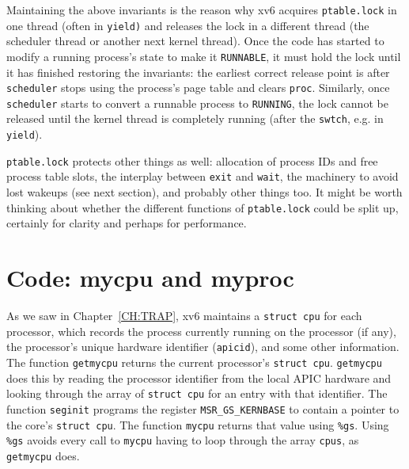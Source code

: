 Maintaining the above invariants is the reason why xv6 acquires 
\lstinline{ptable.lock}
in one thread (often in
\lstinline{yield)}
and releases the lock in a different thread
(the scheduler thread or another next kernel thread).
Once the code has started to modify a running process's state
to make it
\lstinline{RUNNABLE},
it must hold the lock until it has finished restoring
the invariants: the earliest correct release point is after
\lstinline{scheduler}
stops using the process's page table and clears
\lstinline{proc}.
Similarly, once 
\lstinline{scheduler}
starts to convert a runnable process to
\lstinline{RUNNING},
the lock cannot be released until the kernel thread
is completely running (after the
\lstinline{swtch},
e.g. in
\lstinline{yield}).

\lstinline{ptable.lock}
protects other things as well:
allocation of process IDs and free process table slots,
the interplay between
\lstinline{exit}
and
\lstinline{wait},
the machinery to avoid lost wakeups (see next section),
and probably other things too.
It might be worth thinking about whether the 
different functions of
\lstinline{ptable.lock}
could be split up, certainly for clarity and perhaps
for performance.
\section{Code: mycpu and myproc}

As we saw in Chapter~\ref{CH:TRAP},
xv6 maintains a
\lstinline{struct cpu}
for each processor, which records
the process currently running
on the processor (if any),
the processor's unique hardware identifier
(\lstinline{apicid}),
and some other information.
The function
\lstinline{getmycpu}
returns the current processor's
\lstinline{struct cpu}.
\lstinline{getmycpu}
does this by reading the processor
identifier from the local APIC hardware and looking through
the array of
\lstinline{struct cpu}
for an entry with that identifier.
The function 
\lstinline{seginit}
programs the register
\lstinline{MSR_GS_KERNBASE}
to contain a pointer to the core's
\lstinline{struct cpu}.
The function
\lstinline{mycpu}
returns that
value using
\texttt{\%gs}.
Using
\texttt{\%gs}
avoids every call to
\lstinline{mycpu}
having to loop
through the array
\lstinline{cpus},
as
\lstinline{getmycpu}
does.

